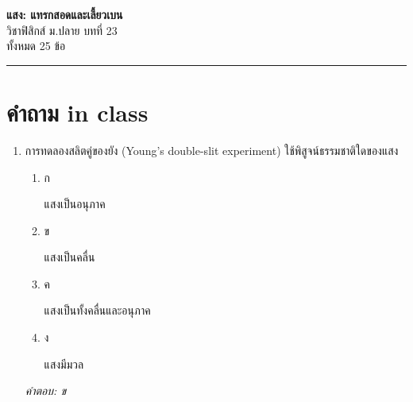 \documentclass[12pt]{article}
\begin{document}
\begin{center}
{\Large\textbf{แสง: แทรกสอดและเลี้ยวเบน}}\\[6pt]
{\normalsize วิชาฟิสิกส์ ม.ปลาย บทที่ 23}\\[4pt]
{\footnotesize ทั้งหมด 25 ข้อ}
\end{center}
\hrule
\bigskip

\section*{คำถาม in class}
\begin{enumerate}[label=\arabic*., itemsep=0.5\baselineskip, topsep=0.5\baselineskip, leftmargin=*]
\item การทดลองสลิตคู่ของยัง (Young's double-slit experiment) ใช้พิสูจน์ธรรมชาติใดของแสง
\begin{enumerate}[label=\alph*)., itemsep=0.3\baselineskip, topsep=0.3\baselineskip]
\item ก\ 
\begin{minipage}[t]{0.9\linewidth}
\raggedright แสงเป็นอนุภาค
\end{minipage}
\item ข\ 
\begin{minipage}[t]{0.9\linewidth}
\raggedright แสงเป็นคลื่น
\end{minipage}
\item ค\ 
\begin{minipage}[t]{0.9\linewidth}
\raggedright แสงเป็นทั้งคลื่นและอนุภาค
\end{minipage}
\item ง\ 
\begin{minipage}[t]{0.9\linewidth}
\raggedright แสงมีมวล
\end{minipage}
\end{enumerate}
\vspace{-0.3\baselineskip}
\begin{small}
\textit{คำตอบ: ข}
\end{small}


\end{enumerate}
\end{document}
